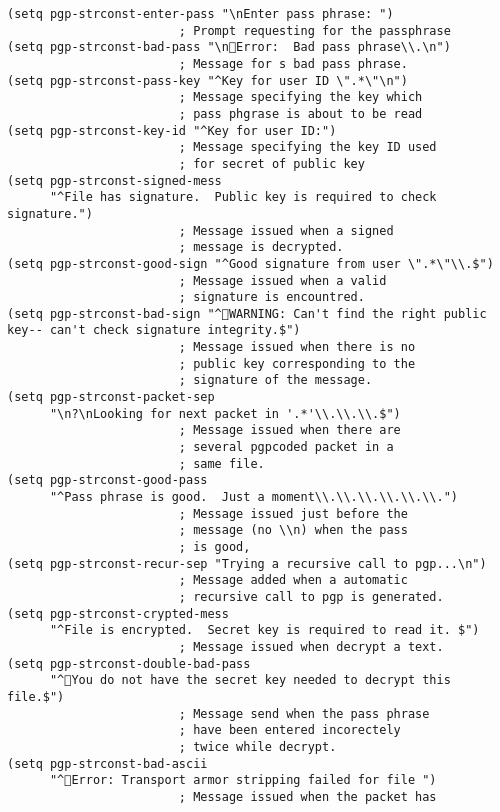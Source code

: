 \begin{verbatim}
(setq pgp-strconst-enter-pass "\nEnter pass phrase: ")
        				; Prompt requesting for the passphrase
(setq pgp-strconst-bad-pass "\nError:  Bad pass phrase\\.\n")
        				; Message for s bad pass phrase.
(setq pgp-strconst-pass-key "^Key for user ID \".*\"\n")
        				; Message specifying the key which
        				; pass phgrase is about to be read
(setq pgp-strconst-key-id "^Key for user ID:")
        				; Message specifying the key ID used 
        				; for secret of public key
(setq pgp-strconst-signed-mess
      "^File has signature.  Public key is required to check signature.")
        				; Message issued when a signed
        				; message is decrypted.
(setq pgp-strconst-good-sign "^Good signature from user \".*\"\\.$")
        				; Message issued when a valid 
        				; signature is encountred.
(setq pgp-strconst-bad-sign "^WARNING: Can't find the right public key-- can't check signature integrity.$")
        				; Message issued when there is no
        				; public key corresponding to the
        				; signature of the message.
(setq pgp-strconst-packet-sep
      "\n?\nLooking for next packet in '.*'\\.\\.\\.$")
        				; Message issued when there are 
        				; several pgpcoded packet in a
        				; same file.
(setq pgp-strconst-good-pass
      "^Pass phrase is good.  Just a moment\\.\\.\\.\\.\\.\\.")
        				; Message issued just before the
        				; message (no \\n) when the pass
        				; is good,
(setq pgp-strconst-recur-sep "Trying a recursive call to pgp...\n")
        				; Message added when a automatic
        				; recursive call to pgp is generated.
(setq pgp-strconst-crypted-mess
      "^File is encrypted.  Secret key is required to read it. $")
        				; Message issued when decrypt a text.
(setq pgp-strconst-double-bad-pass
      "^You do not have the secret key needed to decrypt this file.$")
        				; Message send when the pass phrase
        				; have been entered incorectely
        				; twice while decrypt.
(setq pgp-strconst-bad-ascii
      "^Error: Transport armor stripping failed for file ")
        				; Message issued when the packet has

\end{verbatim}
